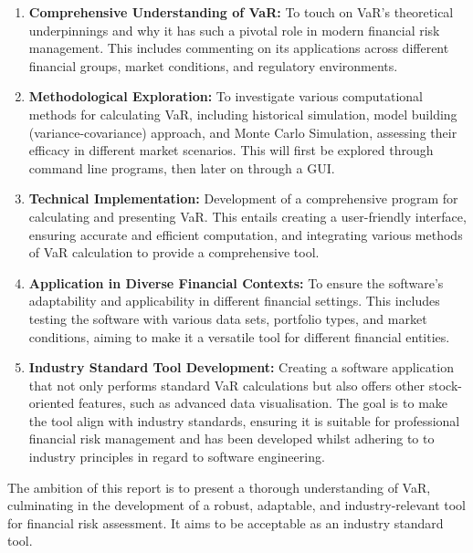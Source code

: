\documentclass{article}
\begin{document}
\begin{enumerate}
    \item \textbf{Comprehensive Understanding of VaR:} To touch on VaR's theoretical underpinnings and why it has such a pivotal role in modern financial risk management. This includes commenting on its applications across different financial groups, market conditions, and regulatory environments.
    
    \item \textbf{Methodological Exploration:} To investigate various computational methods for calculating VaR, including historical simulation, model building (variance-covariance) approach, and Monte Carlo Simulation, assessing their efficacy in different market scenarios. This will first be explored through command line programs, then later on through a GUI\@.
    
    \item \textbf{Technical Implementation:} Development of a comprehensive program for calculating and presenting VaR. This entails creating a user-friendly interface, ensuring accurate and efficient computation, and integrating various methods of VaR calculation to provide a comprehensive tool.
    
    \item \textbf{Application in Diverse Financial Contexts:} To ensure the software's adaptability and applicability in different financial settings. This includes testing the software with various data sets, portfolio types, and market conditions, aiming to make it a versatile tool for different financial entities.
    
    \item \textbf{Industry Standard Tool Development:} Creating a software application that not only performs standard VaR calculations but also offers other stock-oriented features, such as advanced data visualisation. The goal is to make the tool align with industry standards, ensuring it is suitable for professional financial risk management and has been developed whilst adhering to to industry principles in regard to software engineering.
\end{enumerate}

The ambition of this report is to present a thorough understanding of VaR, culminating in the development of a robust, adaptable, and industry-relevant tool for financial risk assessment. It aims to be acceptable as an industry standard tool. 
  
\end{document}
